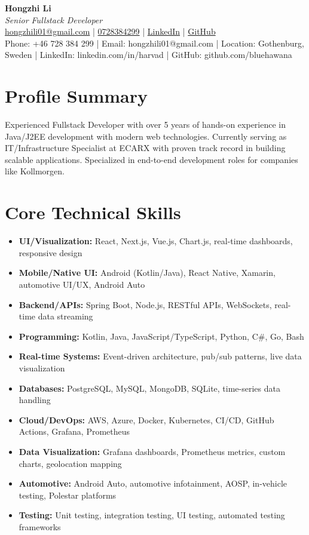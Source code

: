 \documentclass[11pt,a4paper]{article}
\begin{document}
\pagestyle{empty} %

\begin{center}
{\LARGE \textbf{Hongzhi Li}}\\[10pt]
{\Large \textit{Senior Fullstack Developer}}\\[10pt]
\textcolor{linkedinblue}{\href{mailto:hongzhili01@gmail.com}{hongzhili01@gmail.com} | \href{tel:0728384299}{0728384299} | \href{https://www.linkedin.com/in/harvad/}{LinkedIn} | \href{https://github.com/bluehawana}{GitHub}}
\\[6pt]
Phone: +46 728 384 299 | Email: hongzhili01@gmail.com | Location: Gothenburg, Sweden | LinkedIn: linkedin.com/in/harvad | GitHub: github.com/bluehawana
\end{center}

\section*{Profile Summary}
Experienced Fullstack Developer with over 5 years of hands-on experience in Java/J2EE development with modern web technologies. Currently serving as IT/Infrastructure Specialist at ECARX with proven track record in building scalable applications. Specialized in end-to-end development roles for companies like Kollmorgen.

\section*{Core Technical Skills}
\begin{itemize}[noitemsep]
\item \textbf{UI/Visualization:} React, Next.js, Vue.js, Chart.js, real-time dashboards, responsive design
\item \textbf{Mobile/Native UI:} Android (Kotlin/Java), React Native, Xamarin, automotive UI/UX, Android Auto
\item \textbf{Backend/APIs:} Spring Boot, Node.js, RESTful APIs, WebSockets, real-time data streaming
\item \textbf{Programming:} Kotlin, Java, JavaScript/TypeScript, Python, C\#, Go, Bash
\item \textbf{Real-time Systems:} Event-driven architecture, pub/sub patterns, live data visualization
\item \textbf{Databases:} PostgreSQL, MySQL, MongoDB, SQLite, time-series data handling
\item \textbf{Cloud/DevOps:} AWS, Azure, Docker, Kubernetes, CI/CD, GitHub Actions, Grafana, Prometheus
\item \textbf{Data Visualization:} Grafana dashboards, Prometheus metrics, custom charts, geolocation mapping
\item \textbf{Automotive:} Android Auto, automotive infotainment, AOSP, in-vehicle testing, Polestar platforms
\item \textbf{Testing:} Unit testing, integration testing, UI testing, automated testing frameworks
\end{itemize}
\end{document}
